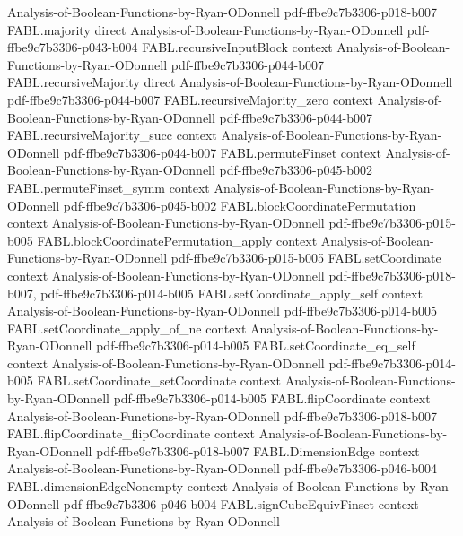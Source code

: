 \begin{theorem}
  {Analysis-of-Boolean-Functions-by-Ryan-ODonnell}
  {pdf-ffbe9c7b3306-p018-b007}
\proofstep
  {FABL.majority}
  {direct}
  {Analysis-of-Boolean-Functions-by-Ryan-ODonnell}
  {pdf-ffbe9c7b3306-p043-b004}
\proofstep
  {FABL.recursiveInputBlock}
  {context}
  {Analysis-of-Boolean-Functions-by-Ryan-ODonnell}
  {pdf-ffbe9c7b3306-p044-b007}
\proofstep
  {FABL.recursiveMajority}
  {direct}
  {Analysis-of-Boolean-Functions-by-Ryan-ODonnell}
  {pdf-ffbe9c7b3306-p044-b007}
\proofstep
  {FABL.recursiveMajority_zero}
  {context}
  {Analysis-of-Boolean-Functions-by-Ryan-ODonnell}
  {pdf-ffbe9c7b3306-p044-b007}
\proofstep
  {FABL.recursiveMajority_succ}
  {context}
  {Analysis-of-Boolean-Functions-by-Ryan-ODonnell}
  {pdf-ffbe9c7b3306-p044-b007}
\proofstep
  {FABL.permuteFinset}
  {context}
  {Analysis-of-Boolean-Functions-by-Ryan-ODonnell}
  {pdf-ffbe9c7b3306-p045-b002}
\proofstep
  {FABL.permuteFinset_symm}
  {context}
  {Analysis-of-Boolean-Functions-by-Ryan-ODonnell}
  {pdf-ffbe9c7b3306-p045-b002}
\proofstep
  {FABL.blockCoordinatePermutation}
  {context}
  {Analysis-of-Boolean-Functions-by-Ryan-ODonnell}
  {pdf-ffbe9c7b3306-p015-b005}
\proofstep
  {FABL.blockCoordinatePermutation_apply}
  {context}
  {Analysis-of-Boolean-Functions-by-Ryan-ODonnell}
  {pdf-ffbe9c7b3306-p015-b005}
\proofstep
  {FABL.setCoordinate}
  {context}
  {Analysis-of-Boolean-Functions-by-Ryan-ODonnell}
  {pdf-ffbe9c7b3306-p018-b007,
    pdf-ffbe9c7b3306-p014-b005}
\proofstep
  {FABL.setCoordinate_apply_self}
  {context}
  {Analysis-of-Boolean-Functions-by-Ryan-ODonnell}
  {pdf-ffbe9c7b3306-p014-b005}
\proofstep
  {FABL.setCoordinate_apply_of_ne}
  {context}
  {Analysis-of-Boolean-Functions-by-Ryan-ODonnell}
  {pdf-ffbe9c7b3306-p014-b005}
\proofstep
  {FABL.setCoordinate_eq_self}
  {context}
  {Analysis-of-Boolean-Functions-by-Ryan-ODonnell}
  {pdf-ffbe9c7b3306-p014-b005}
\proofstep
  {FABL.setCoordinate_setCoordinate}
  {context}
  {Analysis-of-Boolean-Functions-by-Ryan-ODonnell}
  {pdf-ffbe9c7b3306-p014-b005}
\proofstep
  {FABL.flipCoordinate}
  {context}
  {Analysis-of-Boolean-Functions-by-Ryan-ODonnell}
  {pdf-ffbe9c7b3306-p018-b007}
\proofstep
  {FABL.flipCoordinate_flipCoordinate}
  {context}
  {Analysis-of-Boolean-Functions-by-Ryan-ODonnell}
  {pdf-ffbe9c7b3306-p018-b007}
\proofstep
  {FABL.DimensionEdge}
  {context}
  {Analysis-of-Boolean-Functions-by-Ryan-ODonnell}
  {pdf-ffbe9c7b3306-p046-b004}
\proofstep
  {FABL.dimensionEdgeNonempty}
  {context}
  {Analysis-of-Boolean-Functions-by-Ryan-ODonnell}
  {pdf-ffbe9c7b3306-p046-b004}
\proofstep
  {FABL.signCubeEquivFinset}
  {context}
  {Analysis-of-Boolean-Functions-by-Ryan-ODonnell}

\end{theorem}
